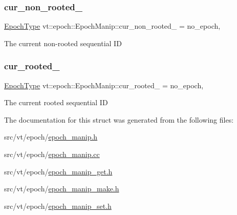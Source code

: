 \subsubsection{\texorpdfstring{cur\+\_\+non\+\_\+rooted\+\_\+}{cur\_non\_rooted\_}}
{\footnotesize\ttfamily \hyperlink{namespacevt_a985a5adf291c34a3ca263b3378388236}{Epoch\+Type} vt\+::epoch\+::\+Epoch\+Manip\+::cur\+\_\+non\+\_\+rooted\+\_\+ = no\+\_\+epoch\hspace{0.3cm}{\ttfamily [static]}, {\ttfamily [private]}}

The current non-\/rooted sequential ID \mbox{\label{structvt_1_1epoch_1_1_epoch_manip_a855b3178e81730c751c6620b8146a575}} 
\subsubsection{\texorpdfstring{cur\+\_\+rooted\+\_\+}{cur\_rooted\_}}
{\footnotesize\ttfamily \hyperlink{namespacevt_a985a5adf291c34a3ca263b3378388236}{Epoch\+Type} vt\+::epoch\+::\+Epoch\+Manip\+::cur\+\_\+rooted\+\_\+ = no\+\_\+epoch\hspace{0.3cm}{\ttfamily [static]}, {\ttfamily [private]}}

The current rooted sequential ID 

The documentation for this struct was generated from the following files\+:\begin{DoxyCompactItemize}
\item 
src/vt/epoch/\hyperlink{epoch__manip_8h}{epoch\+\_\+manip.\+h}\item 
src/vt/epoch/\hyperlink{epoch__manip_8cc}{epoch\+\_\+manip.\+cc}\item 
src/vt/epoch/\hyperlink{epoch__manip__get_8h}{epoch\+\_\+manip\+\_\+get.\+h}\item 
src/vt/epoch/\hyperlink{epoch__manip__make_8h}{epoch\+\_\+manip\+\_\+make.\+h}\item 
src/vt/epoch/\hyperlink{epoch__manip__set_8h}{epoch\+\_\+manip\+\_\+set.\+h}\end{DoxyCompactItemize}

